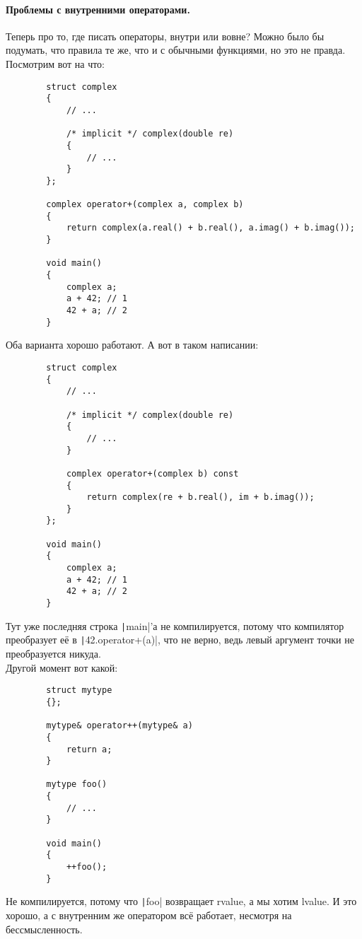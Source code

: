 \documentclass{article}
\begin{document}
    \paragraph{Проблемы с внутренними операторами.}
    Теперь про то, где писать операторы, внутри или вовне? Можно было бы подумать, что правила те же, что и с обычными функциями, но это не правда. Посмотрим вот на что:
    \begin{verbatim}
        struct complex
        {
            // ...
            
            /* implicit */ complex(double re)
            {
                // ...
            }
        };

        complex operator+(complex a, complex b)
        {
            return complex(a.real() + b.real(), a.imag() + b.imag());
        }

        void main()
        {
            complex a;
            a + 42; // 1
            42 + a; // 2
        }
    \end{verbatim}
    Оба варианта хорошо работают. А вот в таком написании:
    \begin{verbatim}
        struct complex
        {
            // ...
            
            /* implicit */ complex(double re)
            {
                // ...
            }

            complex operator+(complex b) const
            {
                return complex(re + b.real(), im + b.imag());
            }
        };

        void main()
        {
            complex a;
            a + 42; // 1
            42 + a; // 2
        }
    \end{verbatim}
    Тут уже последняя строка \texttt|main|'а не компилируется, потому что компилятор преобразует её в \texttt|42.operator+(a)|, что не верно, ведь левый аргумент точки не преобразуется никуда.\\
    Другой момент вот какой:
    \begin{verbatim}
        struct mytype
        {};

        mytype& operator++(mytype& a)
        {
            return a;
        }

        mytype foo()
        {
            // ...
        }

        void main()
        {
            ++foo();
        }
    \end{verbatim}
    Не компилируется, потому что \texttt|foo| возвращает rvalue, а мы хотим lvalue. И это хорошо, а с внутренним же оператором всё работает, несмотря на бессмысленность.\\
\end{document}

